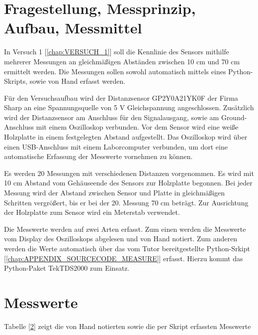 \documentclass[12pt,oneside,a4paper]{report}
\begin{document}
\section{Fragestellung, Messprinzip, Aufbau, Messmittel}
\label{chap:VERSUCH_1_FRAGESTELLUNG}
In Versuch 1 [\ref{chap:VERSUCH_1}] soll die Kennlinie des Sensors mithilfe mehrerer Messungen an gleichmäßigen Abständen zwischen 10 cm und 70 cm ermittelt werden. Die Messungen sollen sowohl automatisch mittels eines Python-Skripts, sowie von Hand erfasst werden.

Für den Versuchsaufbau wird der Distanzsensor GP2Y0A21YK0F der Firma Sharp an eine Spannungsquelle von 5 V Gleichspannung angeschlossen. Zusätzlich wird der Distanzsensor am Anschluss für den Signalausgang, sowie am Ground-Anschluss mit einem Oszilloskop verbunden. Vor dem Sensor wird eine weiße Holzplatte in einem festgelegten Abstand aufgestellt. Das Oszilloskop wird über einen USB-Anschluss mit einem Laborcomputer verbunden, um dort eine automatische Erfassung der Messwerte vornehmen zu können.

Es werden 20 Messungen mit verschiedenen Distanzen vorgenommen. Es wird mit 10 cm Abstand vom Gehäuseende des Sensors zur Holzplatte begonnen. Bei jeder Messung wird der Abstand zwischen Sensor und Platte in gleichmäßigen Schritten vergrößert, bis er bei der 20. Messung 70 cm beträgt. Zur Ausrichtung der Holzplatte zum Sensor wird ein Meterstab verwendet.

Die Messwerte werden auf zwei Arten erfasst. Zum einen werden die Messwerte vom Display des Oszilloskops abgelesen und von Hand notiert. Zum anderen werden die Werte automatisch über das vom Tutor bereitgestellte Python-Srkipt [\ref*{chap:APPENDIX_SOURCECODE_MEASURE}] erfasst. Hierzu kommt das Python-Paket TekTDS2000 zum Einsatz.

\section{Messwerte}
\label{chap:VERSUCH_1_MESSWERTE}
Tabelle [\ref{chap:VERSUCH_1_MESSWERTE}] zeigt die von Hand notierten sowie die per Skript erfassten Messwerte
\end{document}
